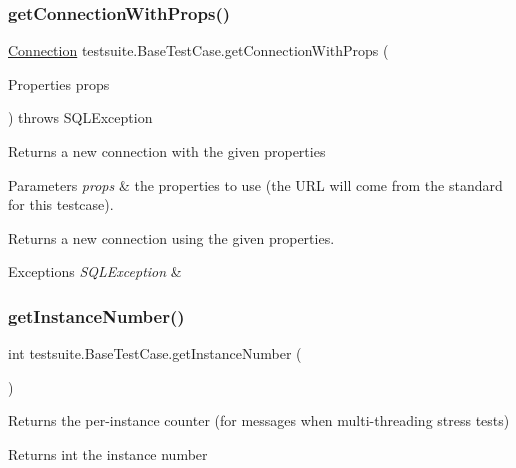 \subsubsection{\texorpdfstring{get\+Connection\+With\+Props()}{getConnectionWithProps()}}
{\footnotesize\ttfamily \mbox{\hyperlink{interfacecom_1_1mysql_1_1jdbc_1_1_connection}{Connection}} testsuite.\+Base\+Test\+Case.\+get\+Connection\+With\+Props (\begin{DoxyParamCaption}\item[{Properties}]{props }\end{DoxyParamCaption}) throws S\+Q\+L\+Exception}

Returns a new connection with the given properties


\begin{DoxyParams}{Parameters}
{\em props} & the properties to use (the U\+RL will come from the standard for this testcase).\\
\hline
\end{DoxyParams}
\begin{DoxyReturn}{Returns}
a new connection using the given properties.
\end{DoxyReturn}

\begin{DoxyExceptions}{Exceptions}
{\em S\+Q\+L\+Exception} & \\
\hline
\end{DoxyExceptions}
\mbox{\label{classtestsuite_1_1_base_test_case_a06bbcacd72ff13e3905c04aada69feea}} 
\subsubsection{\texorpdfstring{get\+Instance\+Number()}{getInstanceNumber()}}
{\footnotesize\ttfamily int testsuite.\+Base\+Test\+Case.\+get\+Instance\+Number (\begin{DoxyParamCaption}{ }\end{DoxyParamCaption})\hspace{0.3cm}{\ttfamily [protected]}}

Returns the per-\/instance counter (for messages when multi-\/threading stress tests)

\begin{DoxyReturn}{Returns}
int the instance number 
\end{DoxyReturn}
\mbox{\label{classtestsuite_1_1_base_test_case_ac50ae23586e12eaab184308368a6fb1d}} 
